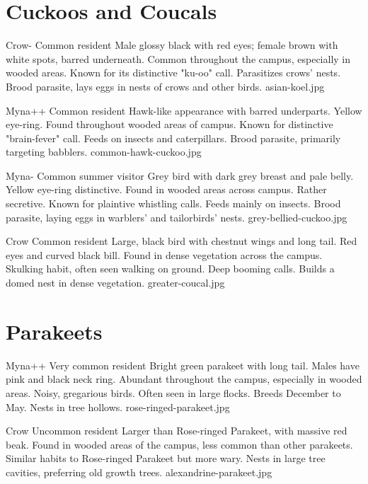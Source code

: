 \documentclass[aspectratio=169]{beamer}
\begin{document}
\section{Cuckoos and Coucals}
{Crow-}
{Common resident}
{Male glossy black with red eyes; female brown with white spots, barred underneath.}
{Common throughout the campus, especially in wooded areas.}
{Known for its distinctive "ku-oo" call. Parasitizes crows' nests.}
{Brood parasite, lays eggs in nests of crows and other birds.}
{asian-koel.jpg}

{Myna++}
{Common resident}
{Hawk-like appearance with barred underparts. Yellow eye-ring.}
{Found throughout wooded areas of campus.}
{Known for distinctive "brain-fever" call. Feeds on insects and caterpillars.}
{Brood parasite, primarily targeting babblers.}
{common-hawk-cuckoo.jpg}

{Myna-}
{Common summer visitor}
{Grey bird with dark grey breast and pale belly. Yellow eye-ring distinctive.}
{Found in wooded areas across campus.}
{Rather secretive. Known for plaintive whistling calls. Feeds mainly on insects.}
{Brood parasite, laying eggs in warblers' and tailorbirds' nests.}
{grey-bellied-cuckoo.jpg}

{Crow}
{Common resident}
{Large, black bird with chestnut wings and long tail. Red eyes and curved black bill.}
{Found in dense vegetation across the campus.}
{Skulking habit, often seen walking on ground. Deep booming calls.}
{Builds a domed nest in dense vegetation.}
{greater-coucal.jpg}

\section{Parakeets}
{Myna++}
{Very common resident}
{Bright green parakeet with long tail. Males have pink and black neck ring.}
{Abundant throughout the campus, especially in wooded areas.}
{Noisy, gregarious birds. Often seen in large flocks.}
{Breeds December to May. Nests in tree hollows.}
{rose-ringed-parakeet.jpg}

{Crow}
{Uncommon resident}
{Larger than Rose-ringed Parakeet, with massive red beak.}
{Found in wooded areas of the campus, less common than other parakeets.}
{Similar habits to Rose-ringed Parakeet but more wary.}
{Nests in large tree cavities, preferring old growth trees.}
{alexandrine-parakeet.jpg}
\end{document}
